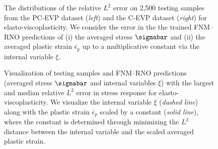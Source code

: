 \documentclass[letterpaper,11pt]{article}
\begin{document}
\begin{figure}[htbp]
    \centering
    \caption{The distributions of the relative $L^2$ error on 2,500 testing samples from the PC-EVP dataset (\textit{left}) and the C-EVP dataset (\textit{right}) for elasto-viscoplasticity. We consider the error in the the trained FNM--RNO predictions of (i) the averaged stress $\sigmabar$ and (ii) the averaged plastic strain $\overline{\epsilon}_p$ up to a multiplicative constant via the internal variable $\xi$.}
    \label{fig:evp_error_distribution}
\end{figure}

\begin{figure}[htbp]
    \centering
    \caption{Visualization of testing samples and FNM--RNO predictions (averaged stress $\sigmabar$ and internal variables $\xi$) with the largest and median relative $L^2$ error in stress response for elasto-viscoplasticity. We visualize the internal variable $\xi$ (\textit{dashed line}) along with the plastic strain $\overline{\epsilon}_p$ scaled by a constant (\textit{solid line}), where the constant is determined through minimizing the $L^2$ distance between the internal variable and the scaled averaged plastic strain.}
    \label{fig:testing_visual_EVP}
\end{figure}
\end{document}
